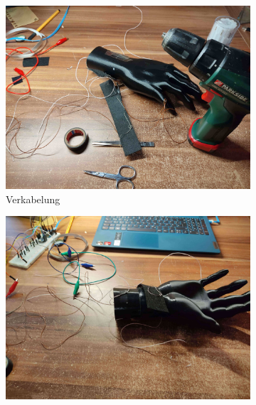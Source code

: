 \documentclass[11pt, a4paper]{article}
\begin{document}
\begin{figure}[h]
	\begin{subfigure}[c]{0.33\textwidth}
		\includegraphics[scale=.037]{assets/Drill_markers.jpg}
		\caption{Verkabelung}
		\label{fig:Initial_drawing4}
	\end{subfigure}
	\begin{subfigure}[c]{0.33\textwidth}
		\includegraphics[scale=.037]{assets/Testing_before_finalizing.jpg}
		\label{fig:Initial_drawing5}
	\end{subfigure}
		\begin{subfigure}[c]{0.3\textwidth}

\end{subfigure}
\end{figure}
\end{document}
